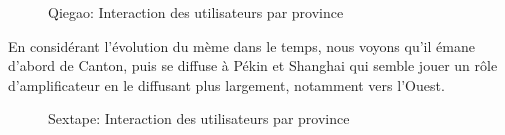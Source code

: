 \begin{figure}
{    }
    
  \caption{
    Qiegao: Interaction des utilisateurs par province
  }
\end{figure}

  


En consid\'erant l{\textquoteright}\'evolution du m\`eme dans le temps,
nous voyons qu{\textquoteright}il \'emane d{\textquoteright}abord de
Canton, puis se diffuse \`a P\'ekin et Shanghai qui semble jouer un
r\^ole d{\textquoteright}amplificateur en le diffusant plus largement,
notamment vers l{\textquoteright}Ouest. 



\begin{figure}
    \centering
    
  \caption{
    Sextape: Interaction des utilisateurs par province
  }
\end{figure}

